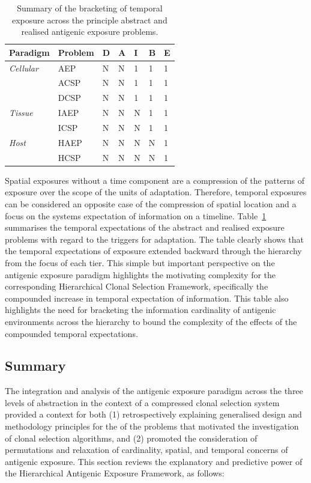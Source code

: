 \begin{table}[htp]
	\centering\small
		\begin{tabular}{lllllll}
		\toprule
		\textbf{Paradigm} & \textbf{Problem} & \textbf{D} & \textbf{A} & \textbf{I} & \textbf{B} & \textbf{E} \\ 
		\toprule
		\emph{Cellular} & AEP 	& N & N & 1 & 1 & 1 \\ 
		 & ACSP 						  	& N & N & 1 & 1 & 1 \\ 
		 & DCSP 								& N & N & 1 & 1 & 1 \\ 
		\midrule
		\emph{Tissue} & IAEP 		& N & N & N & 1 & 1 \\ 
		 & ICSP 								& N & N & N & 1 & 1 \\ 
		\midrule
		\emph{Host} & HAEP 			& N & N & N & N & 1 \\ 
		 & HCSP 								& N & N & N & N & 1 \\ 
		\bottomrule
		\end{tabular}
	\caption{Summary of the bracketing of temporal exposure across the principle abstract and realised antigenic exposure problems.}
	\label{tab:framework:haef:bracketing:exposures:temporal}
\end{table}

Spatial exposures without a time component are a compression of the patterns of exposure over the scope of the units of adaptation. Therefore, temporal exposures can be considered an opposite case of the compression of spatial location and a focus on the systems expectation of information on a timeline. Table~\ref{tab:framework:haef:bracketing:exposures:temporal} summarises the temporal expectations of the abstract and realised exposure problems with regard to the triggers for adaptation. The table clearly shows that the temporal expectations of exposure extended backward through the hierarchy from the focus of each tier. This simple but important perspective on the antigenic exposure paradigm highlights the motivating complexity for the corresponding Hierarchical Clonal Selection Framework, specifically the compounded increase in temporal expectation of information. This table also highlights the need for bracketing the information cardinality of antigenic environments across the hierarchy to bound the complexity of the effects of the compounded temporal expectations. 


%
%
\subsection{Summary}
\label{sec:framework:haef:summary}
The integration and analysis of the antigenic exposure paradigm across the three levels of abstraction in the context of a compressed clonal selection system provided a context for both (1) retrospectively explaining generalised design and methodology principles for the of the problems that motivated the investigation of clonal selection algorithms, and (2) promoted the consideration of permutations and relaxation of cardinality, spatial, and temporal concerns of antigenic exposure. This section reviews the explanatory and predictive power of the Hierarchical Antigenic Exposure Framework, as follows:

